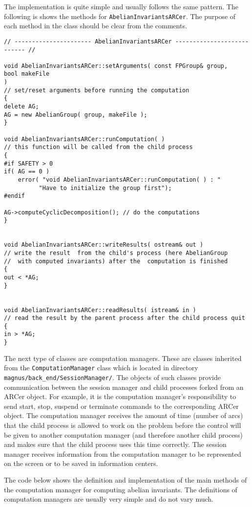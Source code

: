 \documentclass[12pt]{article}
\begin{document}
The implementation is quite simple and usually follows the same pattern.
The following is shows the methods for {\tt AbelianInvariantsARCer}.
The purpose of each method in the class should be clear from the  comments.


\footnotesize
\begin{verbatim}
// ---------------------- AbelianInvariantsARCer --------------------------- //

void AbelianInvariantsARCer::setArguments( const FPGroup& group,
bool makeFile
)
// set/reset arguments before running the computation
{
delete AG;
AG = new AbelianGroup( group, makeFile );
}

void AbelianInvariantsARCer::runComputation( )
// this function will be called from the child process
{
#if SAFETY > 0
if( AG == 0 )
    error( "void AbelianInvariantsARCer::runComputation( ) : "
          "Have to initialize the group first");
#endif

AG->computeCyclicDecomposition(); // do the computations
}


void AbelianInvariantsARCer::writeResults( ostream& out )
// write the result  from the child's process (here AbelianGroup
//  with computed invariants) after the  computation is finished
{
out < *AG;
}


void AbelianInvariantsARCer::readResults( istream& in )
// read the result by the parent process after the child process quit
{
in > *AG;
}
\end{verbatim}
\normalsize


The next type of classes are computation managers. These are
classes inherited from the
{\tt ComputationManager} class which  is located in directory
{\tt magnus/back\_end/SessionManager/}.
The objects of such classes provide communication between
the session manager and child
processes forked from an ARCer object.
For example, it is the computation manager's responsibility to send
start, stop, suspend or terminate commands to the corresponding ARCer object.
The computation manager receives the amount of time (number of arcs) 
that the child
process is allowed to work on the problem
before the control will be given to another computation manager
(and therefore another child process) and makes sure that the child
process uses this time
correctly. The session manager receives information from
the computation manager to be
represented on the screen or to be saved in information centers.


The code below shows the definition and implementation of
the main methods of the computation manager for computing abelian invariants.
The definitions of computation managers are usually very simple
and do not vary much.
\end{document}
